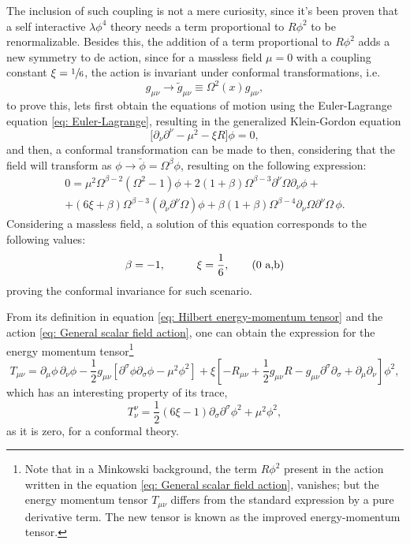 The inclusion of such coupling is not a mere curiosity, since it's been proven \cite{Bunch_Renorm} that a self interactive $\lambda\phi^4$ theory needs a term proportional to $R\phi^2$ to be renormalizable. Besides this, the addition of a term proportional to $R\phi^2$ adds a new symmetry to de action, since for a massless field $\mu=0$ with a coupling constant $\xi=\sfrac{1}{6}$, the action is invariant under conformal transformations, i.e.
\begin{equation}\label{eq: Conformal Transformation}
	g_{\mu\nu}\rightarrow \tilde{g}_{\mu\nu}\equiv \Omega^2(x)g_{\mu\nu},
\end{equation}
to prove this, lets first obtain the equations of motion using the Euler-Lagrange equation \ref{eq: Euler-Lagrange}, resulting in the generalized Klein-Gordon equation
\begin{equation}\label{eq: Klein-Gordon General}
	\big[\partial_\nu\partial^\nu-\mu^2-\xi R\big]\phi=0,
\end{equation}
and then, a conformal transformation can be made to then, considering that the field will transform as $\phi\rightarrow\tilde{\phi}=\Omega^\beta\phi$, resulting on the following expression:
\begin{multline}
	0=\mu^2\Omega^{\beta-2}\left(\Omega^2-1\right)\phi+2\left(1+\beta\right)\Omega^{\beta-3}\partial^\nu\Omega\partial_\nu\phi+\\
	+(6\xi+\beta)\Omega^{\beta-3}\left(\partial_\nu\partial^\nu\Omega\right)\phi+\beta(1+\beta)\Omega^{\beta-4}\partial_\nu\Omega\partial^\nu\Omega\,\phi.
\end{multline}
Considering a massless field, a solution of this equation corresponds to the following values:
\begin{subequations}
	\begin{gather}
		\beta=-1,\hspace{1.0cm} \xi=\frac{1}{6},\tag{\theequation \,\,a,b}
	\end{gather}
\end{subequations}
proving the conformal invariance for such scenario.

From its definition in equation \ref{eq: Hilbert energy-momentum tensor} and the action \ref{eq: General scalar field action}, one can obtain the expression for the energy momentum tensor\footnote{Note that in a Minkowski background, the term $R\phi^2$ present in the action written in the equation \ref{eq: General scalar field action}, vanishes; but the energy momentum tensor $T_{\mu\nu}$ differs from the standard expression by a pure derivative term. The new tensor is known as the improved energy-momentum tensor.}
\begin{equation}\label{eq: Energy-Momentum scalar}
	T_{\mu\nu}=\partial_\mu\phi\,\partial_\nu\phi -\frac{1}{2}g_{\mu\nu}\left[\partial^\sigma\phi\partial_\sigma\phi-\mu^2\phi^2\right]+\xi\left[-R_{\mu\nu}+\frac{1}{2}g_{\mu\nu}R-g_{\mu\nu}\partial^\sigma\partial_\sigma+\partial_\mu\partial_\nu\right]\phi^2,
\end{equation}
which has an interesting property of its trace,
\begin{equation}
	T^\nu_\nu=\frac{1}{2}\left(6\xi-1\right)\partial_\sigma\partial^\sigma\phi^2+\mu^2\phi^2,
\end{equation}
as it is zero, for a conformal theory.
